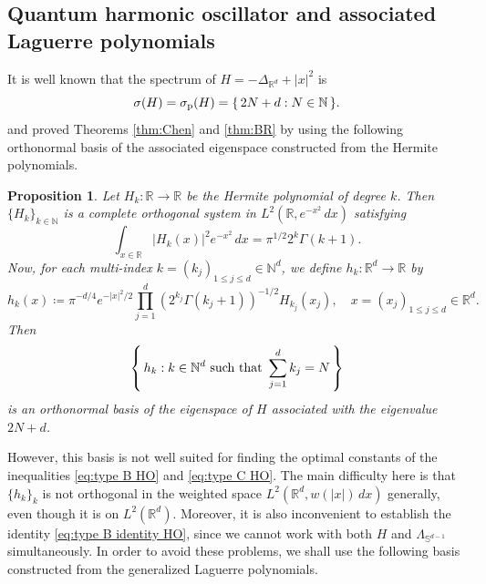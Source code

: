 \documentclass[reqno]{amsart}
\theoremstyle{plain}
\newtheorem{proposition}[theorem]{Proposition}
\numberwithin{equation}{section}
\theoremstyle{remark}
\newcommand{\R}{\mathbb{R}}
\newcommand{\N}{\mathbb{N}}
\renewcommand{\S}{\mathbb{S}}
\newcommand{\abs}[1]{\lvert#1\rvert}
\newcommand{\set}[2]{\{ \, #1 : #2 \, \} }
\newcommand{\Set}[2]{ \mleft \{ \, #1 : #2 \, \mright\} }
\newcommand{\Hamiltonian}{H}
\newcommand{\Laplacian}{\Delta}
\newcommand{\LaplacianR}{\Laplacian_{\R^d}}
\newcommand{\LambdaS}{\Lambda_{\S^{d-1}}}
\newcommand{\hk}[1]{h_{#1}}
\newcommand{\Hk}[1]{H_{#1}}
\begin{document}
\subsection{Quantum harmonic oscillator and associated Laguerre polynomials} \label{section:Laguerre}
It is well known that the spectrum of $\Hamiltonian = - \LaplacianR + \abs{x}^2$ is
\begin{equation}
	\sigma(\Hamiltonian) = \sigma_{\textup{p}}(\Hamiltonian) = \set{ 2N+d }{ N \in \N } .
\end{equation}
\citet{Che2011} and \citet{BR2011} proved Theorems \ref{thm:Chen} and \ref{thm:BR} by using the following orthonormal basis of the associated eigenspace constructed from the Hermite polynomials.
 \begin{proposition} \label{prop:Hermite decomposition}
 	Let $\Hk{k} \colon \R \to \R$ be the Hermite polynomial of degree $k$.
 	Then $\{ \Hk{k} \}_{k \in \N}$ is a complete orthogonal system in $L^2(\R, e^{-x^2} \, dx )$ satisfying
 	\begin{equation}
 	\int_{x \in \R} \abs{\Hk{k}(x)}^2 e^{-x^2} \, dx = \pi^{1/2} 2^k \Gamma(k+1) .
 	\end{equation}
 	Now, for each multi-index $k = (k_j)_{1 \leq j \leq d} \in \N^d$, we define $\hk{k} \colon \R^d \to \R$ by 
 	\begin{equation}
 		\hk{k}(x) \coloneqq \pi^{-d/4} e^{-\abs{x}^2/2} \prod_{j=1}^{d} (  2^{k_j} \Gamma(k_j + 1) )^{-1/2} \Hk{k_j}(x_j) , \quad x = (x_j)_{1 \leq j \leq d} \in \R^d .
 		\label{eq:Hermite functions}
 	\end{equation}
 	Then
 	\begin{equation}
 		\Set{ \hk{k} }{ k \in \N^d \text{ such that } \sum_{j=1}^{d} k_j = N }
 	\end{equation}
 	is an orthonormal basis of the eigenspace of $\Hamiltonian$ associated with the eigenvalue $2N + d$.
 \end{proposition}
However, this basis is not well suited for finding the optimal constants of the inequalities \eqref{eq:type B HO} and \eqref{eq:type C HO}.
The main difficulty here is that $\{ h_k \}_k$ is not orthogonal in the weighted space $L^2(\R^d, w(\abs{x})\, dx)$ generally, even though it is on $L^2(\R^d)$.
Moreover, it is also inconvenient to establish the identity \eqref{eq:type B identity HO}, since we cannot work with both $\Hamiltonian$ and $\LambdaS$ simultaneously.
In order to avoid these problems, we shall use the following basis constructed from the generalized Laguerre polynomials.
\end{document}
